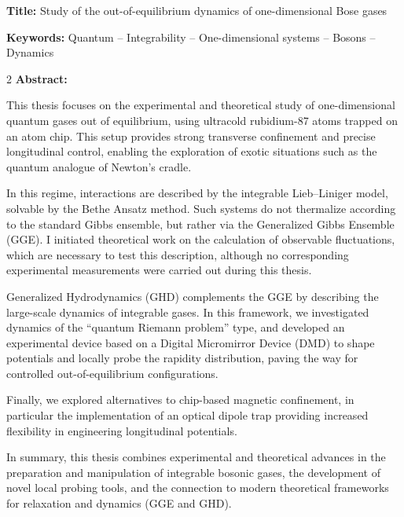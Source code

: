 \documentclass[french,12pt,a4paper]{book}
\begin{document}
\begin{mdframed}[linecolor=Prune,linewidth=1]

\textbf{Title:} Study of the out-of-equilibrium dynamics of one-dimensional Bose gases

\noindent \textbf{Keywords:} Quantum – Integrability – One-dimensional systems – Bosons – Dynamics

\begin{multicols}{2}
\noindent \textbf{Abstract:}  {\fontsize{11pt}{6pt}\selectfont 
This thesis focuses on the experimental and theoretical study of one-dimensional quantum gases out of equilibrium, using ultracold rubidium-87 atoms trapped on an atom chip. This setup provides strong transverse confinement and precise longitudinal control, enabling the exploration of exotic situations such as the quantum analogue of Newton’s cradle.

\medskip

In this regime, interactions are described by the integrable Lieb–Liniger model, solvable by the Bethe Ansatz method. Such systems do not thermalize according to the standard Gibbs ensemble, but rather via the Generalized Gibbs Ensemble (GGE). I initiated theoretical work on the calculation of observable fluctuations, which are necessary to test this description, although no corresponding experimental measurements were carried out during this thesis.

\medskip

Generalized Hydrodynamics (GHD) complements the GGE by describing the large-scale dynamics of integrable gases. In this framework, we investigated dynamics of the “quantum Riemann problem” type, and developed an experimental device based on a Digital Micromirror Device (DMD) to shape potentials and locally probe the rapidity distribution, paving the way for controlled out-of-equilibrium configurations.

\medskip

Finally, we explored alternatives to chip-based magnetic confinement, in particular the implementation of an optical dipole trap providing increased flexibility in engineering longitudinal potentials.

\medskip

In summary, this thesis combines experimental and theoretical advances in the preparation and manipulation of integrable bosonic gases, the development of novel local probing tools, and the connection to modern theoretical frameworks for relaxation and dynamics (GGE and GHD).

}
\end{multicols}
\end{mdframed}
\end{document}
